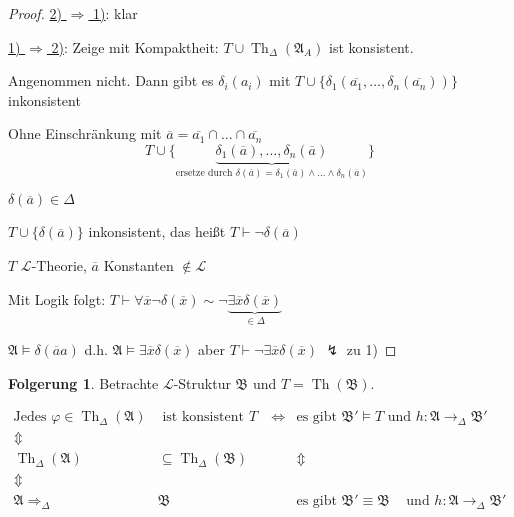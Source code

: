 \documentclass[12pt,parskip=full]{scrartcl}
\newcommand{\heading}{\underline}
\theoremstyle{definition}
\newtheorem{corollary}[theorem]{Folgerung}
\begin{document}
	\begin{proof}
		\heading{2) $\Rightarrow$ 1)}: klar
		
		\heading{1) $\Rightarrow$ 2)}: Zeige mit Kompaktheit: $T \cup \operatorname{Th}_\Delta(\mathfrak{A}_A)$ ist konsistent.
		
		Angenommen nicht. Dann gibt es $\delta_i(a_i)$ mit $T \cup \{ \delta_1(\overline{a_1}, \dots, \delta_n(\overline{a_n})) \}$ inkonsistent
		
		Ohne Einschränkung mit $\overline{a} = \overline{a_1} \cap \dots \cap \overline{a_n}$
		\begin{equation*}
			T \cup \{ \underbrace{\delta_1(\overline{a}), \dots, \delta_n(\overline{a})}_{\text{ersetze durch $\delta(\overline{a}) = \delta_1(\overline{a}) \land \dots \land \delta_n(\overline{a})$}} \}
		\end{equation*}
		
		$\delta(\overline{a}) \in \Delta$
		
		$T \cup \{ \delta(\overline{a}) \}$ inkonsistent, das heißt $T \vdash \lnot \delta(\overline{a})$
		
		$T$ $\mathcal{L}$-Theorie, $\overline{a}$ Konstanten $\notin \mathcal{L}$
		
		Mit Logik folgt: $T \vdash \forall \overline{x} \lnot \delta(\overline{x}) \sim \lnot \underbrace{\exists \overline{x} \delta(\overline{x})}_{\in \Delta}$
		
		$\mathfrak{A} \models \delta(\overline{a}a)$ d.h. $\mathfrak{A} \models \exists \overline{x} \delta(\overline{x})$ aber $T \vdash \lnot \exists \overline{x} \delta(\overline{x})$ $\lightning$ zu 1)
	\end{proof}

	\begin{corollary}
		Betrachte $\mathcal{L}$-Struktur $\mathfrak{B}$ und $T = \operatorname{Th}(\mathfrak{B})$.
		
		\begin{align*}
			\text{Jedes $\varphi \in \operatorname{Th}_\Delta(\mathfrak{A})$}&\text{ ist konsistent mit $T$} &&\Leftrightarrow& \text{es gibt $\mathfrak{B}' \models T$ und}&\text{ $h: \mathfrak{A} \to_\Delta \mathfrak{B}'$} \\
			\Updownarrow& &&& & \\
			\operatorname{Th}_\Delta(\mathfrak{A}) &\subseteq \operatorname{Th}_\Delta(\mathfrak{B}) &&& \Updownarrow \\
			\Updownarrow& &&& & \\
			\mathfrak{A} \Rightarrow_\Delta& \mathfrak{B} &&& \text{es gibt $\mathfrak{B}' \equiv \mathfrak{B}$ }&\text{und $h: \mathfrak{A} \to_\Delta \mathfrak{B}'$}
		\end{align*}
	\end{corollary}
\end{document}
